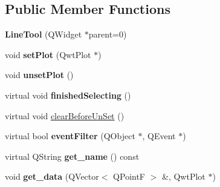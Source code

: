 \subsection*{Public Member Functions}
\begin{DoxyCompactItemize}
\item 
\mbox{\label{classLineTool_a4816628170735e2a05e2308ac65099e0}} 
{\bfseries Line\+Tool} (Q\+Widget $\ast$parent=0)
\item 
\mbox{\label{classLineTool_aca8c6283efaa317a1f3327a9e44e2309}} 
void {\bfseries set\+Plot} (Qwt\+Plot $\ast$)
\item 
\mbox{\label{classLineTool_a00521b226dfd5df9b36d87a439df9a99}} 
void {\bfseries unset\+Plot} ()
\item 
\mbox{\label{classLineTool_a3b1a329dcda63088012e721713049751}} 
virtual void {\bfseries finished\+Selecting} ()
\item 
virtual void \mbox{\hyperlink{classLineTool_a2bcf5d5694e36445607c68c37e4f3f69}{clear\+Before\+Un\+Set}} ()
\item 
\mbox{\label{classTool_a020bd5757a03ea7321848a3874f3a8cb}} 
virtual bool {\bfseries event\+Filter} (Q\+Object $\ast$, Q\+Event $\ast$)
\item 
\mbox{\label{classTool_aa30c64915020a71d0ea8650e8e966336}} 
virtual Q\+String {\bfseries get\+\_\+name} () const
\item 
\mbox{\label{classTool_a507adfcdafc818d9628b952001b93f3c}} 
void {\bfseries get\+\_\+data} (Q\+Vector$<$ Q\+PointF $>$ \&, Qwt\+Plot $\ast$)
\end{DoxyCompactItemize}
